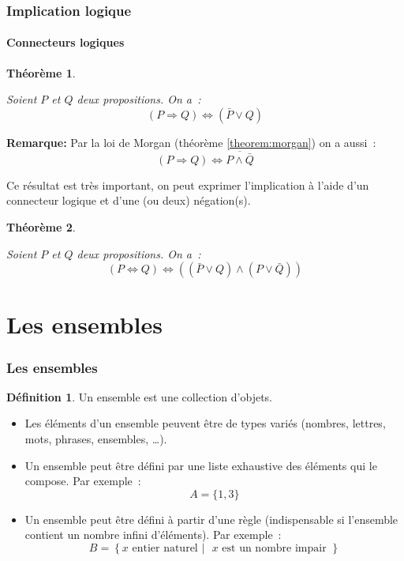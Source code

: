 \documentclass[10pt,notheorems]{beamer}
\theoremstyle{plain}
\newtheorem{theorem}{Théorème}
\theoremstyle{definition} %
\newtheorem{definition}{Définition}
\begin{document}
\begin{frame}
  \frametitle{Implication logique}
  \framesubtitle{Connecteurs logiques}
  \hypertarget{slide_implication_et_connecteurs}{}

  \begin{theorem}\label{theorem:implication:connecteurs}

    Soient $P$ et $Q$ deux propositions. On a~:
    \[
      (P \Rightarrow Q) \Leftrightarrow (\bar P \lor Q)
      \]
  \end{theorem}

  \bigskip

  \textbf{Remarque:} Par la loi de Morgan (théorème \hyperlink{slide_disjonction_conjonction_et_negation}{\ref{theorem:morgan}}) on a aussi~:
  \[
    (P \Rightarrow Q) \Leftrightarrow \overline{P \land \bar Q}
  \]

  Ce résultat est très important, on peut exprimer l'implication à l'aide d'un connecteur logique et d'une (ou deux) négation(s).\newline

  \begin{theorem}\label{theorem:equivalence:connecteurs}

    Soient $P$ et $Q$ deux propositions. On a~:
    \[
      (P \Leftrightarrow Q) \Leftrightarrow \left((\bar P \lor Q) \land (P \lor \bar Q)\right)
    \]
  \end{theorem}

\end{frame}

\section{Les ensembles}

\begin{frame}
  \frametitle{Les ensembles}
  \hypertarget{slide_ensembles_notations_definitions_1}{}

  \begin{definition}
    Un ensemble est une collection d'objets.
  \end{definition}

  \medskip

  \begin{itemize}
  \item Les éléments d'un ensemble peuvent être de types variés (nombres, lettres, mots, phrases, ensembles, \ldots).\newline
  \item Un ensemble peut être défini par une liste exhaustive des éléments qui le compose. Par exemple~:
    \[
      A = \{1,3\}
    \]
  \item Un ensemble peut être défini à partir d'une règle (indispensable si l'ensemble contient un nombre infini d'éléments). Par exemple~:
    \[
      B = \left\{ x \text{ entier naturel } | \text{ } x \text{ est un nombre impair }\right\}
    \]
  \end{itemize}

\end{frame}
\end{document}
